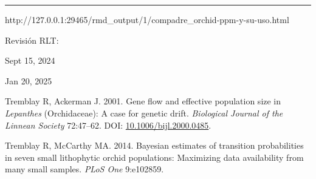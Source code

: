 \documentclass[
  12pt,
  letterpaper,
]{book}
\newlength{\cslhangindent}
\newenvironment{CSLReferences}[2] %
 {\begin{list}{}{%
  \setlength{\itemindent}{0pt}
  \setlength{\leftmargin}{0pt}
  \setlength{\parsep}{0pt}
  \ifodd #1
   \setlength{\leftmargin}{\cslhangindent}
   \setlength{\itemindent}{-1\cslhangindent}
  \fi
  \setlength{\itemsep}{#2\baselineskip}}}
 {\end{list}}
\begin{document}
\begin{center}\rule{0.5\linewidth}{0.5pt}\end{center}

http://127.0.0.1:29465/rmd\_output/1/compadre\_orchid-ppm-y-su-uso.html

Revisión RLT:

Sept 15, 2024

Jan 20, 2025

\label{refs}
\begin{CSLReferences}{1}{0}
Tremblay R, Ackerman J. 2001. Gene flow and effective population size in
\emph{{L}epanthes} ({O}rchidaceae): A case for genetic drift.
\emph{Biological Journal of the Linnean Society} 72:47--62. DOI:
\href{https://doi.org/10.1006/bijl.2000.0485}{10.1006/bijl.2000.0485}.

Tremblay R, McCarthy MA. 2014. Bayesian estimates of transition
probabilities in seven small lithophytic orchid populations: Maximizing
data availability from many small samples. \emph{PLoS One} 9:e102859.

\end{CSLReferences}


\backmatter
\end{document}
